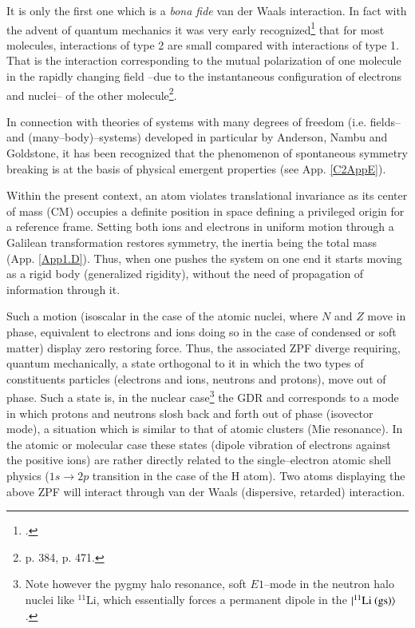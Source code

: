 \begin{subappendices}
It is only the first one which is a \textit{bona fide} van der Waals interaction. In fact with the advent of quantum mechanics it was very early  recognized\footnote{\cite{London:30}.} that for most molecules, interactions of type 2 are small compared with interactions of type 1. That is the interaction corresponding to the mutual polarization of one molecule in the rapidly changing field --due to the instantaneous configuration of electrons and nuclei-- of the other molecule\footnote{\cite{Pauling:63} p. 384, \cite{Born:69} p. 471.}.



In connection with theories of systems with many degrees of freedom (i.e. fields-- and (many--body)--systems) developed in particular by Anderson, Nambu and Goldstone, it has been recognized that the phenomenon of spontaneous symmetry breaking is at the basis of physical emergent properties (see App. \ref{C2AppE}).


Within the present context, an atom violates translational invariance as its center of mass (CM) occupies a definite position in space defining a privileged origin for a reference frame. Setting both ions and electrons in uniform motion through a Galilean transformation restores symmetry, the inertia being the total mass (App. \ref{App1.D}). Thus, when one pushes the system  on one end it starts moving as a rigid body (generalized rigidity), without the need  of propagation of information through it.


Such a motion (isoscalar in the case of the atomic nuclei, where $N$ and $Z$ move in phase, equivalent to electrons and ions doing so in the case of condensed or soft matter) display zero restoring force. Thus, the associated ZPF diverge requiring, quantum mechanically, a state orthogonal to it in which the two types of constituents particles (electrons and ions, neutrons and protons), move out of phase. Such a state is, in the nuclear case\footnote{Note however the  pygmy halo resonance, soft $E1$--mode in the neutron halo nuclei like $^{11}$Li, which essentially forces a permanent dipole in the $|{^{11}\text{Li (gs)}} \rangle$.} the GDR and corresponds to a mode in which protons and neutrons slosh back and forth out of phase (isovector mode), a situation which is similar to that of atomic clusters (Mie resonance). In the atomic or molecular case these states (dipole vibration of electrons against the positive ions) are rather directly related to the single--electron atomic shell physics ($1s\to2p$ transition in the case of the H atom). Two atoms displaying the above ZPF will interact through van der Waals (dispersive, retarded) interaction.

\end{subappendices}
